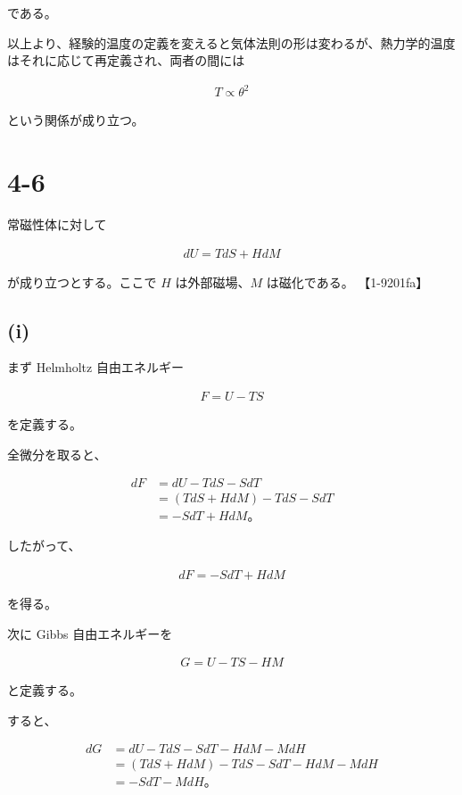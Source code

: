 \documentclass[platex,dvipdfmx,a4paper]{jsarticle}
\begin{document}
である。

以上より、経験的温度の定義を変えると気体法則の形は変わるが、熱力学的温度はそれに応じて再定義され、両者の間には

\begin{align*}
T\propto\theta^2
\end{align*}

という関係が成り立つ。
\section{4-6}

常磁性体に対して

\begin{align*}
dU
=
TdS+HdM
\end{align*}

が成り立つとする。ここで $H$ は外部磁場、$M$ は磁化である。 【1-9201fa】

\subsection{(i)}

まず Helmholtz 自由エネルギー

\begin{align*}
F
=
U-TS
\end{align*}

を定義する。

全微分を取ると、

\begin{align*}
dF
&=
dU-TdS-SdT \\
&=
(TdS+HdM)-TdS-SdT \\
&=
-SdT+HdM。
\end{align*}

したがって、

\begin{align*}
dF
=
-SdT+HdM
\end{align*}

を得る。

次に Gibbs 自由エネルギーを

\begin{align*}
G
=
U-TS-HM
\end{align*}

と定義する。

すると、

\begin{align*}
dG
&=
dU-TdS-SdT-HdM-MdH \\
&=
(TdS+HdM)-TdS-SdT-HdM-MdH \\
&=
-SdT-MdH。
\end{align*}
\end{document}
